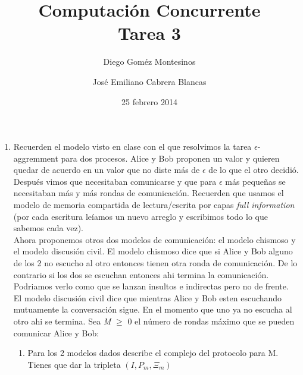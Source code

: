\documentclass{article}
\title{Computación Concurrente \\ \Large{Tarea 3}}
\author{
  Diego Goméz Montesinos
  \and
  José Emiliano Cabrera Blancas
  }
\date{25 febrero 2014}
\begin{document}
\maketitle
\begin{enumerate}
\item{
    Recuerden el modelo visto en clase con el que resolvimos la tarea
    $\epsilon$-aggremment para dos procesos. Alice y Bob proponen un valor y
    quieren quedar de acuerdo en un valor que no diste más de $\epsilon$ de lo
    que el otro decidió. Después vimos que necesitaban comunicarse y que para 
    $\epsilon$ más pequeñas se necesitaban más y más rondas de comunicación.
    Recuerden que usamos el modelo de memoria compartida de lectura/escrita por
    capas \textit{full information} (por cada escritura leíamos un nuevo
    arreglo y escribimos todo lo que sabemos cada vez).\\
    Ahora proponemos otros dos modelos de comunicación: el modelo chismoso y el
    modelo discusión civil. El modelo chismoso dice que si Alice y Bob alguno de
    los 2 no escucho al otro entonces tienen otra ronda de comunicación. De lo
    contrario si los dos se escuchan entonces ahi termina la comunicación.
    Podriamos verlo como que se lanzan insultos e indirectas pero no de frente.\\
    El modelo discusión civil dice que mientras Alice y Bob esten escuchando 
    mutuamente la conversación sigue. En el momento que uno ya no escucha al otro
    ahi se termina.
    Sea \textit{M} $≥$ 0 el número de rondas máximo que se pueden comunicar Alice
    y Bob:

    \begin{enumerate}
      \item{Para los 2 modelos dados describe el complejo del protocolo para M. 
        Tienes que dar la tripleta $(I,P_m,\Xi_m)$}\\\\
        

\end{enumerate}}
\end{enumerate}
\end{document}
